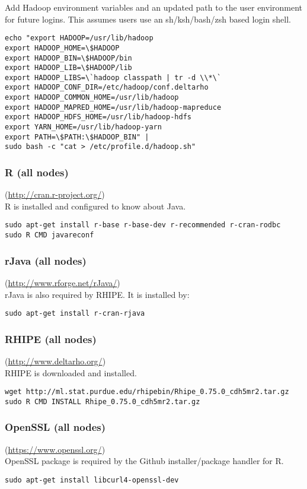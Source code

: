 Add Hadoop environment variables and an updated path to the user environment for future logins.  This assumes users use an sh/ksh/bash/zsh based login shell.
\begin{verbatim}
echo "export HADOOP=/usr/lib/hadoop
export HADOOP_HOME=\$HADOOP
export HADOOP_BIN=\$HADOOP/bin
export HADOOP_LIB=\$HADOOP/lib
export HADOOP_LIBS=\`hadoop classpath | tr -d \\*\`
export HADOOP_CONF_DIR=/etc/hadoop/conf.deltarho
export HADOOP_COMMON_HOME=/usr/lib/hadoop
export HADOOP_MAPRED_HOME=/usr/lib/hadoop-mapreduce
export HADOOP_HDFS_HOME=/usr/lib/hadoop-hdfs
export YARN_HOME=/usr/lib/hadoop-yarn
export PATH=\$PATH:\$HADOOP_BIN" |
sudo bash -c "cat > /etc/profile.d/hadoop.sh"
\end{verbatim}

\subsubsection{R (all nodes)} (\url{http://cran.r-project.org/})\\
R is installed and configured to know about Java.
\begin{verbatim}
sudo apt-get install r-base r-base-dev r-recommended r-cran-rodbc
sudo R CMD javareconf
\end{verbatim}

\subsubsection{rJava (all nodes)}(\url{http://www.rforge.net/rJava/})\\
rJava is also required by RHIPE.  It is installed by:

\begin{verbatim}
sudo apt-get install r-cran-rjava
\end{verbatim}

\subsubsection{RHIPE (all nodes)}(\url{http://www.deltarho.org/})\\
RHIPE is downloaded and installed.
\begin{verbatim}
wget http://ml.stat.purdue.edu/rhipebin/Rhipe_0.75.0_cdh5mr2.tar.gz
sudo R CMD INSTALL Rhipe_0.75.0_cdh5mr2.tar.gz
\end{verbatim}

\subsubsection{OpenSSL (all nodes)}(\url{https://www.openssl.org/})\\
OpenSSL package is required by the Github installer/package handler for R.
\begin{verbatim}
sudo apt-get install libcurl4-openssl-dev
\end{verbatim}

